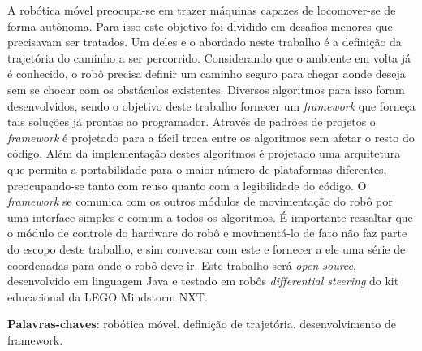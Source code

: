 \begin{resumo}
A robótica móvel preocupa-se em trazer máquinas capazes de locomover-se de forma autônoma. Para isso este objetivo foi dividido em desafios menores que precisavam ser tratados. Um deles e o abordado neste trabalho é a definição da trajetória do caminho a ser percorrido. Considerando que o ambiente em volta já é conhecido, o robô precisa definir um caminho seguro para chegar aonde deseja sem se chocar com os obstáculos existentes. Diversos algoritmos para isso foram desenvolvidos, sendo o objetivo deste trabalho fornecer um \textit{framework} que forneça tais soluções já prontas ao programador. Através de padrões de projetos o \textit{framework} é projetado para a fácil troca entre os algoritmos sem afetar o resto do código. Além da implementação destes algoritmos é projetado uma arquitetura que permita a portabilidade para o maior número de plataformas diferentes, preocupando-se tanto com reuso quanto com a legibilidade do código. O \textit{framework} se comunica com os outros módulos de movimentação do robô por uma interface simples e comum a todos os algoritmos. É importante ressaltar que o módulo de controle do hardware do robô e movimentá-lo de fato não faz parte do escopo deste trabalho, e sim conversar com este e fornecer a ele uma série de coordenadas para onde o robô deve ir. Este trabalho será \textit{open-source}, desenvolvido em linguagem Java e testado em robôs \textit{differential steering} do kit educacional da LEGO Mindstorm NXT.

 \vspace{\onelineskip}
    
 \noindent
 \textbf{Palavras-chaves}: robótica móvel. definição de trajetória. desenvolvimento de framework.
\end{resumo}
